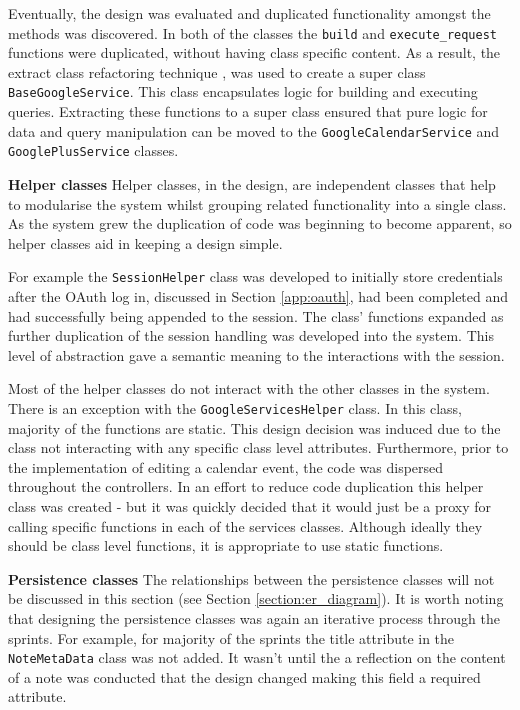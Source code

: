 Eventually, the design was evaluated and duplicated functionality amongst the methods was discovered. In both of the classes the \texttt{build} and \texttt{execute\_request} functions were duplicated, without having class specific content. As a result, the extract class refactoring technique \cite{citeulike:14023810}, was used to create a super class \texttt{BaseGoogleService}. This class encapsulates logic for building  and executing queries. Extracting these functions to a super class ensured that pure logic for data and query manipulation can be moved to the \texttt{GoogleCalendarService} and \texttt{GooglePlusService} classes.


\noindent
\textbf{Helper classes}
\newline
Helper classes, in the design, are independent classes that help to modularise the system whilst grouping related functionality into a single class. As the system grew the duplication of code was beginning to become apparent, so helper classes aid in keeping a design simple.

For example the \texttt{SessionHelper} class was developed to initially store credentials after the OAuth log in, discussed in Section \ref{app:oauth}, had been completed and had successfully being appended to the session. The class' functions expanded as further duplication of the session handling was developed into the system.  This level of abstraction gave a semantic meaning to the interactions with the session.

Most of the helper classes do not interact with the other classes in the system. There is an exception with the \texttt{GoogleServicesHelper} class. In this class, majority of the functions are static. This design decision was induced due to the class not interacting with any specific class level attributes. Furthermore, prior to the implementation of editing a calendar event, the code was dispersed throughout the controllers. In an effort to reduce code duplication this helper class was created - but it was quickly decided that it would just be a proxy for calling specific functions in each of the services classes. Although ideally they should be class level functions, it is appropriate to use static functions.

\noindent
\textbf{Persistence classes}
\newline
The relationships between the persistence classes will not be discussed in this section (see Section \ref{section:er_diagram}). It is worth noting that designing the persistence classes was again an iterative process through the sprints. For example, for majority of the sprints the title attribute in the \texttt{NoteMetaData} class was not added. It wasn't until the a reflection on the content of a note was conducted that the design changed making this field a required attribute.

